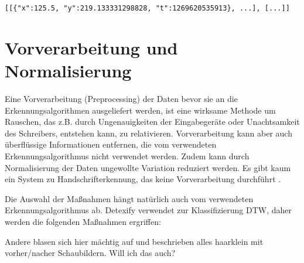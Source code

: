 \lstinline![[{"x":125.5, "y":219.133331298828, "t":1269620535913}, ...], [...]]!

\section{Vorverarbeitung und Normalisierung} 

\label{sec:vorverarbeitung}

Eine Vorverarbeitung (Preprocessing) der Daten bevor sie an die Erkennungsalgorithmen ausgeliefert werden, ist eine wirksame Methode um Rauschen, das z.B. durch Ungenauigkeiten der Eingabegeräte oder Unachtsamkeit des Schreibers, entstehen kann, zu relativieren. Vorverarbeitung kann aber auch überflüssige Informationen entfernen, die vom verwendeten Erkennungsalgorithmus nicht verwendet werden. Zudem kann durch Normalisierung der Daten ungewollte Variation reduziert werden. Es gibt kaum ein System zu Handschrifterkennung, das keine Vorverarbeitung durchführt \cite{Jaeger:2003p1097,Plamondon:2000p10303,Tappert:1990p10302}.

Die Auswahl der Maßnahmen hängt natürlich auch vom verwendeten Erkennungsalgorithmus ab. Detexify verwendet zur Klassifizierung \ac{DTW}, daher werden die folgenden Maßnahmen ergriffen:

\TODO Andere blasen sich hier mächtig auf und beschrieben alles haarklein mit vorher/nacher Schaubildern. Will ich das auch?

